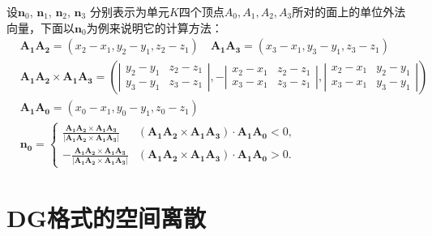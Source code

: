 \documentclass[a4paper, 12pt, UTF8]{ctexart}
\newcommand{\bs}[1]{\boldsymbol{#1}}
\begin{document}
设$\bs n_{0}$, $\bs n_{1}$, $\bs n_{2}$, $\bs n_{3}$ 分别表示为单元$K$四个顶点$A_{0}, A_{1}, A_{2}, A_{3}$所对的面上的单位外法向量，下面以$\bs n_{0}$为例来说明它的计算方法：
\begin{equation}
\begin{split}
&\bs{A_{1} A_{2}} = \left(x_{2}-x_{1}, y_{2}-y_{1}, z_{2}-z_{1}\right) \quad
\bs{A_{1} A_{3}}=\left(x_{3}-x_{1}, y_{3}-y_{1}, z_{3}-z_{1}\right) \\
&\bs{A_{1} A_{2}} \times \bs{A_{1} A_{3}} =\left(\left|\begin{array}{ll}
y_{2}-y_{1} & z_{2}-z_{1} \\
y_{3}-y_{1} & z_{3}-z_{1}
\end{array}\right|,-\left|\begin{array}{ll}
x_{2}-x_{1} & z_{2}-z_{1} \\
x_{3}-x_{1} & z_{3}-z_{1}
\end{array}\right|,\left|\begin{array}{ll}
x_{2}-x_{1} & y_{2}-y_{1} \\
x_{3}-x_{1} & y_{3}-y_{1}
\end{array}\right|\right) \\
&\bs{A_{1} A_{0}} = \left(x_{0}-x_{1}, y_{0}-y_{1}, z_{0}-z_{1}\right) \\[3mm] 
&\bs{n_{0}} = \left\{
\begin{array}{ll}
\frac{\displaystyle \bs{A_{1} A_{2}} \times \bs{A_{1} A_{3}}}{\left| \displaystyle \bs{A_{1} A_{2}} \times \bs{A_{1} A_{3}}\right|} & \left(\bs{A_{1} A_{2}} \times \bs{A_{1} A_{3}}\right) \cdot \bs{A_{1} A_{0}} < 0, \\[5mm] 
-\frac{\displaystyle \bs{A_{1} A_{2}} \times \bs{A_{1} A_{3}}}{\left| \displaystyle \bs{A_{1} A_{2}} \times \bs{A_{1} A_{3}}\right|} & \left(\bs{A_{1} A_{2}} \times \bs{A_{1} A_{3}}\right) \cdot \bs{A_{1} A_{0}} > 0.
\end{array}
\right.
\end{split}
\end{equation}


\newpage

\section{DG格式的空间离散}
\end{document}
